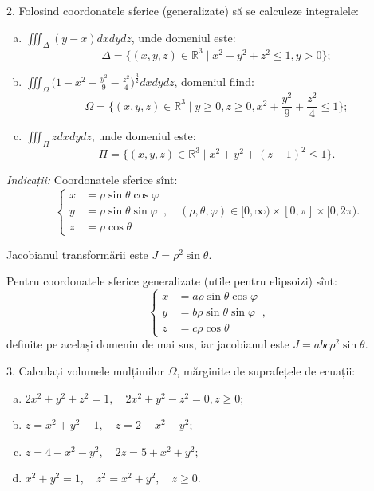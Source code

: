 \documentclass[11pt,a4paper]{article}
\newcommand\ds{\displaystyle}
\newcommand\RR{\mathbb{R}}
\theoremstyle{dotless}
\theoremstyle{dotlessdr}
\begin{document}
\vspace{1cm}

2. Folosind coordonatele sferice (generalizate) să se calculeze integralele:
\begin{enumerate}[(a)]
\item $ \ds\iiint_\Delta ( y - x ) dxdydz $, unde domeniul este:
  \[
    \Delta = \{(x, y, z) \in \RR^3 \mid x^2 + y^2 + z^2 \leq 1, y > 0 \};
  \]
\item $ \ds\iiint_\Omega \Big( 1 - x^2 - \frac{y^2}{9} - \frac{z^2}{4} \Big)^{\frac{3}{2}} dxdydz $,
  domeniul fiind:
  \[
    \Omega = \{ (x, y, z) \in \RR^3 \mid y \geq 0, z \geq 0, x^2 + \frac{y^2}{9} + \frac{z^2}{4} \leq 1 \};
  \]
\item $ \ds\iiint_\Pi z dxdydz $, unde domeniul este:
  \[
    \Pi = \{(x, y, z) \in \RR^3 \mid x^2 + y^2 + (z - 1)^2 \leq 1 \}.
  \]
\end{enumerate}

\emph{Indicații:} Coordonatele sferice sînt:
\[
  \begin{cases}
    x &= \rho \sin \theta \cos \varphi \\
    y &= \rho \sin \theta \sin \varphi \\
    z &= \rho \cos \theta
  \end{cases}, \quad (\rho, \theta, \varphi) \in [0, \infty) \times [0, \pi] \times [0, 2\pi).
\]

Jacobianul transformării este $ J = \rho^2 \sin \theta $.

Pentru coordonatele sferice generalizate (utile pentru elipsoizi) sînt:
\[
  \begin{cases}
    x &= a \rho \sin \theta \cos \varphi \\
    y &= b \rho \sin \theta \sin \varphi \\
    z &= c \rho \cos \theta
  \end{cases},
\]
definite pe același domeniu de mai sus, iar jacobianul este $ J = abc\rho^2 \sin \theta $.

\vspace{1cm}

3. Calculați volumele mulțimilor $ \Omega $, mărginite de suprafețele de ecuații:
\begin{enumerate}[(a)]
\item $ 2x^2 + y^2 + z^2 = 1, \quad 2x^2 + y^2 - z^2 = 0, z \geq 0 $;
\item $ z = x^2 + y^2 - 1, \quad z = 2 - x^2 - y^2 $;
\item $ z = 4 - x^2 - y^2, \quad 2z = 5 + x^2 + y^2 $;
\item $ x^2 + y^2 = 1, \quad z^2 = x^2 + y^2, \quad z \geq 0 $.
\end{enumerate}
\end{document}
